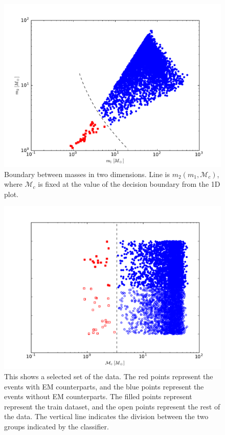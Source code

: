 \begin{figure}[ht]
  \includegraphics[width=\columnwidth]{img/mass-distribution}
  \caption{Boundary between masses in two dimensions. Line is $m_2(m_1, \mathcal{M}_c)$, where $\mathcal{M}_c$ is fixed at the value of the decision boundary from the 1D plot.}
  \label{fig:2D}
\end{figure}

\begin{figure}[ht]
  \includegraphics[width=\columnwidth]{img/classifier_comparison}
  \caption{This shows a selected set of the data. The red points represent the events with EM counterparts, and the blue points represent the events without EM counterparts. The filled points represent represent the train dataset, and the open points represent the rest of the data. The vertical line indicates the division between the two groups indicated by the classifier.}
  \label{fig:class}
\end{figure}

